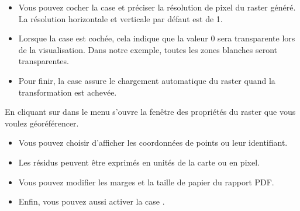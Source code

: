 \begin{itemize}[label=--]
\item Vous pouvez cocher la case  et préciser la résolution de pixel du raster généré. La résolution horizontale et verticale par défaut est de 1.
\item  Lorsque la case  est cochée, cela indique que la valeur 0 sera transparente lors de la visualisation. Dans notre exemple, toutes les zones blanches seront transparentes.
\item Pour finir, la case  assure le chargement automatique du raster quand la transformation est achevée.
\end{itemize}


En cliquant sur  dans le menu  s'ouvre la fenêtre des propriétés du raster que vous voulez géoréférencer.


\begin{itemize}[label=--]
\item Vous pouvez choisir d'afficher les coordonnées de points ou leur identifiant.
\item Les résidus peuvent être exprimés en unités de la carte ou en pixel.
\item Vous pouvez modifier les marges et la taille de papier du rapport PDF.
\item Enfin, vous pouvez aussi activer la case .
\end{itemize}

